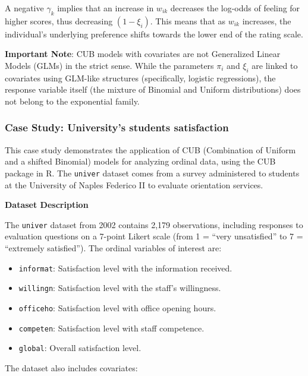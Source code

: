 \documentclass[
  letterpaper,
  DIV=11,
  numbers=noendperiod]{scrartcl}
\begin{document}
A negative \(\gamma_k\) implies that an increase in \(w_{ik}\) decreases
the log-odds of feeling for higher scores, thus decreasing
\((1-\xi_i)\). This means that as \(w_{ik}\) increases, the individual's
underlying preference shifts towards the lower end of the rating scale.

\textbf{Important Note}: CUB models with covariates are not Generalized
Linear Models (GLMs) in the strict sense. While the parameters \(\pi_i\)
and \(\xi_i\) are linked to covariates using GLM-like structures
(specifically, logistic regressions), the response variable itself (the
mixture of Binomial and Uniform distributions) does not belong to the
exponential family.

\hypertarget{case-study-universitys-students-satisfaction}{%
\subsubsection{Case Study: University's students
satisfaction}\label{case-study-universitys-students-satisfaction}}

This case study demonstrates the application of CUB (Combination of
Uniform and a shifted Binomial) models for analyzing ordinal data, using
the CUB package in R. The \texttt{univer} dataset comes from a survey
administered to students at the University of Naples Federico II to
evaluate orientation services.

\textbf{Dataset Description}

The \texttt{univer} dataset from 2002 contains 2,179 observations,
including responses to evaluation questions on a 7-point Likert scale
(from 1 = ``very unsatisfied'' to 7 = ``extremely satisfied''). The
ordinal variables of interest are:

\begin{itemize}
\item
  \texttt{informat}: Satisfaction level with the information received.
\item
  \texttt{willingn}: Satisfaction level with the staff's willingness.
\item
  \texttt{officeho}: Satisfaction level with office opening hours.
\item
  \texttt{competen}: Satisfaction level with staff competence.
\item
  \texttt{global}: Overall satisfaction level.
\end{itemize}

The dataset also includes covariates:
\end{document}
